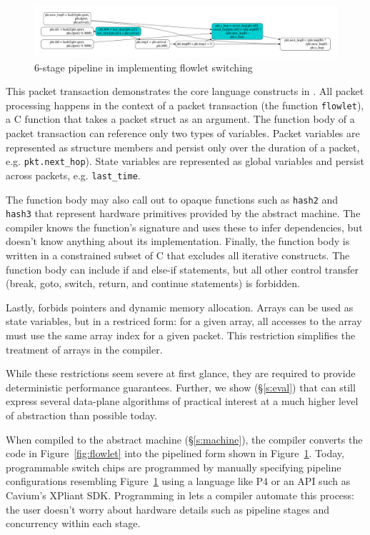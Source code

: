 \begin{figure}[!t]
  \includegraphics[width=\textwidth]{pipe.pdf}
  \caption{6-stage pipeline in \absmachine implementing flowlet switching}
  \label{fig:pipeline}
\end{figure}

This packet transaction demonstrates the core language constructs in
\pktlanguage. All packet processing happens in the context of a packet
transaction (the function \texttt{flowlet}), a C function that takes a packet
struct as an argument. The function body of a packet transaction can reference
only two types of variables. Packet variables are represented as structure
members and persist only over the duration of a packet, e.g.
\texttt{pkt.next\_hop}). State variables are represented as global variables
and persist across packets, e.g. \texttt{last\_time}.

The function body may also call out to opaque functions such as \texttt{hash2}
and \texttt{hash3} that represent hardware primitives provided by the abstract
machine. The \pktlanguage compiler knows the function's signature and uses
these to infer dependencies, but doesn't know anything about its
implementation. Finally, the function body is written in a constrained subset
of C that excludes all iterative constructs. The function body can include if
and else-if statements, but all other control transfer (break, goto, switch,
return, and continue statements) is forbidden.

Lastly, \pktlanguage forbids pointers and dynamic memory allocation. Arrays can
be used as state variables, but in a restriced form: for a given array, all
accesses to the array must use the same array index for a given packet. This
restriction simplifies the treatment of arrays in the compiler.

While these restrictions seem severe at first glance, they are required to
provide deterministic performance guarantees. Further, we show (\S\ref{s:eval})
that \pktlanguage can still express several data-plane algorithms  of practical
interest at a much higher level of abstraction than possible today.

When compiled to the \absmachine abstract machine (\S\ref{s:machine}), the
\pktlanguage compiler converts the code in Figure~\ref{fig:flowlet} into the
pipelined form shown in Figure~\ref{fig:pipeline}. Today, programmable switch
chips are programmed by manually specifying pipeline configurations resembling
Figure~\ref{fig:pipeline} using a language like P4 or an API such as Cavium's
XPliant SDK. Programming in \pktlanguage lets a compiler automate this process:
the user doesn't worry about hardware details such as pipeline stages and
concurrency within each stage.

